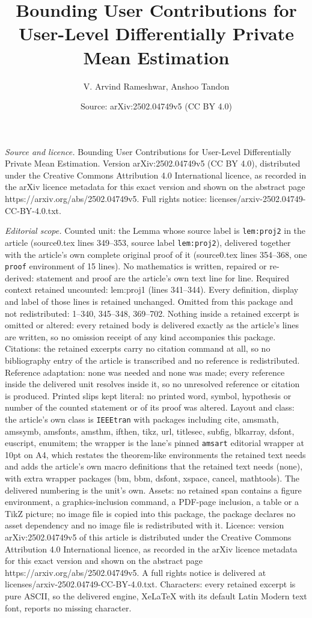 \documentclass[10pt,a4paper]{amsart}
\title[Bounding User Contributions for User-Level Differentially Pr]{Bounding User Contributions for User-Level Differentially Private Mean Estimation}
\author{V. Arvind Rameshwar, Anshoo Tandon}
\date{Source: arXiv:2502.04749v5 (CC BY 4.0)}
\begin{document}
\maketitle

\noindent\emph{Source and licence.} Bounding User Contributions for User-Level Differentially Private Mean Estimation. Version arXiv:2502.04749v5 (CC BY 4.0), distributed under the Creative Commons Attribution 4.0 International licence, as recorded in the arXiv licence metadata for this exact version and shown on the abstract page https://arxiv.org/abs/2502.04749v5. Full rights notice: licenses/arxiv-2502.04749-CC-BY-4.0.txt.\par\smallskip

\noindent\textit{Editorial scope.} Counted unit: the Lemma whose source label is \texttt{lem:proj2} in the article (source0.tex lines 349--353, source label \texttt{lem:proj2}), delivered together with the article's own complete original proof of it (source0.tex lines 354--368, one \texttt{proof} environment of 15 lines). No mathematics is written, repaired or re-derived: statement and proof are the article's own text line for line. Required context retained uncounted: lem:proj1 (lines 341--344). Every definition, display and label of those lines is retained unchanged. Omitted from this package and not redistributed: 1--340, 345--348, 369--702. Nothing inside a retained excerpt is omitted or altered: every retained body is delivered exactly as the article's lines are written, so no omission receipt of any kind accompanies this package. Citations: the retained excerpts carry no citation command at all, so no bibliography entry of the article is transcribed and no reference is redistributed. Reference adaptation: none was needed and none was made; every reference inside the delivered unit resolves inside it, so no unresolved reference or citation is produced. Printed slips kept literal: no printed word, symbol, hypothesis or number of the counted statement or of its proof was altered. Layout and class: the article's own class is \texttt{IEEEtran} with packages including cite, amsmath, amssymb, amsfonts, amsthm, ifthen, tikz, url, titlesec, subfig, blkarray, dsfont, euscript, enumitem; the wrapper is the lane's pinned \texttt{amsart} editorial wrapper at 10pt on A4, which restates the theorem-like environments the retained text needs and adds the article's own macro definitions that the retained text needs (none), with extra wrapper packages (bm, bbm, dsfont, xspace, cancel, mathtools). The delivered numbering is the unit's own. Assets: no retained span contains a figure environment, a graphics-inclusion command, a PDF-page inclusion, a table or a TikZ picture; no image file is copied into this package, the package declares no asset dependency and no image file is redistributed with it. Licence: version arXiv:2502.04749v5 of this article is distributed under the Creative Commons Attribution 4.0 International licence, as recorded in the arXiv licence metadata for this exact version and shown on the abstract page https://arxiv.org/abs/2502.04749v5. A full rights notice is delivered at licenses/arxiv-2502.04749-CC-BY-4.0.txt. Characters: every retained excerpt is pure ASCII, so the delivered engine, XeLaTeX with its default Latin Modern text font, reports no missing character.
\end{document}
